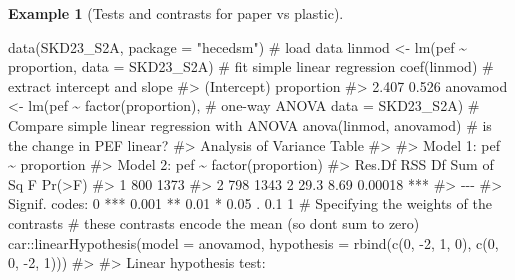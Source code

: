 \documentclass[
  11pt,
  letterpaper,
]{scrbook}
\newenvironment{Shaded}{\begin{snugshade}}{\end{snugshade}}
\newcommand{\AttributeTok}[1]{\textcolor[rgb]{0.40,0.45,0.13}{#1}}
\newcommand{\CommentTok}[1]{\textcolor[rgb]{0.37,0.37,0.37}{#1}}
\newcommand{\DecValTok}[1]{\textcolor[rgb]{0.68,0.00,0.00}{#1}}
\newcommand{\FunctionTok}[1]{\textcolor[rgb]{0.28,0.35,0.67}{#1}}
\newcommand{\NormalTok}[1]{\textcolor[rgb]{0.00,0.23,0.31}{#1}}
\newcommand{\OtherTok}[1]{\textcolor[rgb]{0.00,0.23,0.31}{#1}}
\newcommand{\SpecialCharTok}[1]{\textcolor[rgb]{0.37,0.37,0.37}{#1}}
\newcommand{\StringTok}[1]{\textcolor[rgb]{0.13,0.47,0.30}{#1}}
\theoremstyle{plain}
\theoremstyle{definition}
\newtheorem{example}{Example}[chapter]
\theoremstyle{definition}
\theoremstyle{plain}
\theoremstyle{remark}
\begin{document}
\begin{example}[Tests and contrasts for paper vs
plastic]
\begin{Shaded}
\begin{Highlighting}[]
\FunctionTok{data}\NormalTok{(SKD23\_S2A, }\AttributeTok{package =} \StringTok{"hecedsm"}\NormalTok{) }\CommentTok{\# load data}
\NormalTok{linmod }\OtherTok{\textless{}{-}} \FunctionTok{lm}\NormalTok{(pef }\SpecialCharTok{\textasciitilde{}}\NormalTok{ proportion, }\AttributeTok{data =}\NormalTok{ SKD23\_S2A) }\CommentTok{\# fit simple linear regression}
\FunctionTok{coef}\NormalTok{(linmod) }\CommentTok{\# extract intercept and slope}
\CommentTok{\#\textgreater{} (Intercept)  proportion }
\CommentTok{\#\textgreater{}       2.407       0.526}
\NormalTok{anovamod }\OtherTok{\textless{}{-}} \FunctionTok{lm}\NormalTok{(pef }\SpecialCharTok{\textasciitilde{}} \FunctionTok{factor}\NormalTok{(proportion), }\CommentTok{\# one{-}way ANOVA}
               \AttributeTok{data =}\NormalTok{ SKD23\_S2A) }
\CommentTok{\# Compare simple linear regression with ANOVA}
\FunctionTok{anova}\NormalTok{(linmod, anovamod) }\CommentTok{\# is the change in PEF linear?}
\CommentTok{\#\textgreater{} Analysis of Variance Table}
\CommentTok{\#\textgreater{} }
\CommentTok{\#\textgreater{} Model 1: pef \textasciitilde{} proportion}
\CommentTok{\#\textgreater{} Model 2: pef \textasciitilde{} factor(proportion)}
\CommentTok{\#\textgreater{}   Res.Df  RSS Df Sum of Sq    F  Pr(\textgreater{}F)    }
\CommentTok{\#\textgreater{} 1    800 1373                              }
\CommentTok{\#\textgreater{} 2    798 1343  2      29.3 8.69 0.00018 ***}
\CommentTok{\#\textgreater{} {-}{-}{-}}
\CommentTok{\#\textgreater{} Signif. codes:  0 \textquotesingle{}***\textquotesingle{} 0.001 \textquotesingle{}**\textquotesingle{} 0.01 \textquotesingle{}*\textquotesingle{} 0.05 \textquotesingle{}.\textquotesingle{} 0.1 \textquotesingle{} \textquotesingle{} 1}
\CommentTok{\# Specifying the weights of the contrasts}
\CommentTok{\# these contrasts encode the mean (so don\textquotesingle{}t sum to zero)}
\NormalTok{car}\SpecialCharTok{::}\FunctionTok{linearHypothesis}\NormalTok{(}\AttributeTok{model =}\NormalTok{ anovamod, }
   \AttributeTok{hypothesis =} \FunctionTok{rbind}\NormalTok{(}\FunctionTok{c}\NormalTok{(}\DecValTok{0}\NormalTok{, }\SpecialCharTok{{-}}\DecValTok{2}\NormalTok{, }\DecValTok{1}\NormalTok{, }\DecValTok{0}\NormalTok{), }
                      \FunctionTok{c}\NormalTok{(}\DecValTok{0}\NormalTok{, }\DecValTok{0}\NormalTok{, }\SpecialCharTok{{-}}\DecValTok{2}\NormalTok{, }\DecValTok{1}\NormalTok{)))}
\CommentTok{\#\textgreater{} }
\CommentTok{\#\textgreater{} Linear hypothesis test:}

\end{Highlighting}
\end{Shaded}
\end{example}
\end{document}
